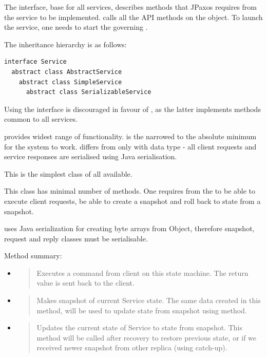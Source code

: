 The  interface, base for all services, describes methods that JPaxos requires from the service to be implemented.  calls all the API methods on the  object. To launch the service, one needs to start the governing .

The inheritance hierarchy is as follows:

\begin{Verbatim}[commandchars=@\[\]]
interface Service
  abstract class AbstractService
    abstract class SimpleService
      abstract class SerializableService
\end{Verbatim}

Using the  interface is discouraged in favour of , as the latter implements methods common to all services.

 provides widest range of functionality.  is the  narrowed to the absolute minimum for the system to work.  differs from  only with data type - all client requests and service responses are serialised using Java serialisation.


\label{api:serializableservice-class}
This is the simplest class of all available.

This class has minimal number of methods. One requires from the  to be able to execute client requests, be able to create a snapshot and roll back to state from a snapshot.

 uses Java serialization for creating byte arrays from Object, therefore snapshot, request and reply classes must be serialisable.

Method summary:
\begin{itemize}
\item {} 
\begin{quote}

Executes a command from client on this state machine. The return value is sent back to the client.
\end{quote}

\item {} 
\begin{quote}

Makes snapshot of current Service state. The same data created in this method, will be used to update state from snapshot using  method.
\end{quote}

\item {} 
\begin{quote}

Updates the current state of Service to state from snapshot. This method will be called after recovery to restore previous state, or if we received newer snapshot from other replica (using catch-up).
\end{quote}

\end{itemize}



